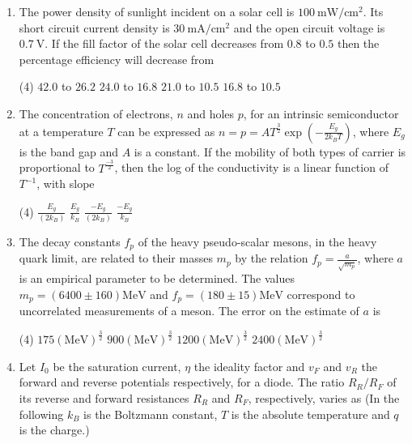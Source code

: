 \begin{enumerate}
	\item The power density of sunlight incident on a solar cell is $100 \mathrm{~mW} / \mathrm{cm}^{2}$. Its short circuit current density is $30 \mathrm{~mA} / \mathrm{cm}^{2}$ and the open circuit voltage is $0.7 \mathrm{~V}$. If the fill factor of the solar cell decreases from $0.8$ to $0.5$ then the percentage efficiency will decrease from
	{}
	\begin{tasks}(4)
		\task[\textbf{A.}] $42.0$ to $26.2$
		\task[\textbf{B.}] $24.0$ to $16.8$
		\task[\textbf{C.}] $21.0$ to $10.5$
		\task[\textbf{D.}] $16.8$ to $10.5$
	\end{tasks}
	\item The concentration of electrons, $n$ and holes $p$, for an intrinsic semiconductor at a temperature $T$ can be expressed as $n=p=A T^{\frac{3}{2}} \exp \left(-\frac{E_{g}}{2 k_{B} T}\right)$, where $E_{g}$ is the band gap and $A$ is a constant. If the mobility of both types of carrier is proportional to $T^{\frac{-3}{2}}$, then the log of the conductivity is a linear function of $T^{-1}$, with slope
	{	}
	\begin{tasks}(4)
		\task[\textbf{A.}]$\frac{E_{g}}{\left(2 k_{B}\right)}$
		\task[\textbf{B.}] $\frac{E_{g}}{k_{B}}$
		\task[\textbf{C.}] $\frac{-E_{g}}{\left(2 k_{B}\right)}$
		\task[\textbf{D.}] $\frac{-E_{g}}{k_{B}}$
	\end{tasks}
	\item The decay constants $f_{p}$ of the heavy pseudo-scalar mesons, in the heavy quark limit, are related to their masses $m_{p}$ by the relation $f_{p}=\frac{a}{\sqrt{m_{p}}}$, where $a$ is an empirical parameter to be determined. The values $m_{p}=(6400 \pm 160) \mathrm{MeV}$ and $f_{p}=(180 \pm 15) \mathrm{MeV}$ correspond to uncorrelated measurements of a meson. The error on the estimate of $a$ is
	{	}
	\begin{tasks}(4)
		\task[\textbf{A.}] $175(\mathrm{MeV})^{\frac{3}{2}}$
		\task[\textbf{B.}] $900(\mathrm{MeV})^{\frac{3}{2}}$
		\task[\textbf{C.}] $1200(\mathrm{MeV})^{\frac{3}{2}}$
		\task[\textbf{D.}] $2400(\mathrm{MeV})^{\frac{3}{2}}$
	\end{tasks}
	\item Let $I_{0}$ be the saturation current, $\eta$ the ideality factor and $v_{F}$ and $v_{R}$ the forward and reverse potentials respectively, for a diode. The ratio $R_{R} / R_{F}$ of its reverse and forward resistances $R_{R}$ and $R_{F}$, respectively, varies as (In the following $k_{B}$ is the Boltzmann constant, $T$ is the absolute temperature and $q$ is the charge.)

\end{enumerate}
